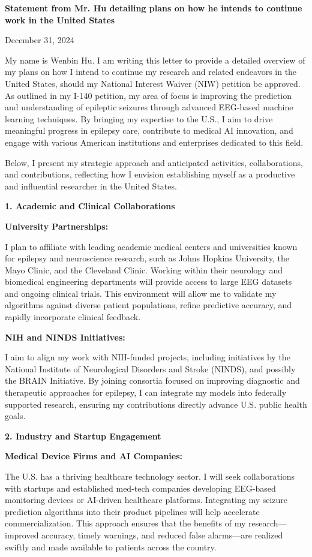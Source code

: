 \documentclass{article}
\begin{document}
\clearpage

{\bf Statement from Mr. Hu detailing plans on how he intends to continue work in the United States}

\label{plans}
December 31, 2024

My name is Wenbin Hu. I am writing this letter to provide a detailed overview of my plans on how I intend to continue my research and related endeavors in the United States, should my National Interest Waiver (NIW) petition be approved. As outlined in my I-140 petition, my area of focus is improving the prediction and understanding of epileptic seizures through advanced EEG-based machine learning techniques. By bringing my expertise to the U.S., I aim to drive meaningful progress in epilepsy care, contribute to medical AI innovation, and engage with various American institutions and enterprises dedicated to this field.

Below, I present my strategic approach and anticipated activities, collaborations, and contributions, reflecting how I envision establishing myself as a productive and influential researcher in the United States.


{\bf 1. Academic and Clinical Collaborations }

{\bf University Partnerships: }

I plan to affiliate with leading academic medical centers and universities known for epilepsy and neuroscience research, such as Johns Hopkins University, the Mayo Clinic, and the Cleveland Clinic. Working within their neurology and biomedical engineering departments will provide access to large EEG datasets and ongoing clinical trials. This environment will allow me to validate my algorithms against diverse patient populations, refine predictive accuracy, and rapidly incorporate clinical feedback.

{\bf NIH and NINDS Initiatives: }

I aim to align my work with NIH-funded projects, including initiatives by the National Institute of Neurological Disorders and Stroke (NINDS), and possibly the BRAIN Initiative. By joining consortia focused on improving diagnostic and therapeutic approaches for epilepsy, I can integrate my models into federally supported research, ensuring my contributions directly advance U.S. public health goals.

{\bf 2. Industry and Startup Engagement }

{\bf Medical Device Firms and AI Companies: }

The U.S. has a thriving healthcare technology sector. I will seek collaborations with startups and established med-tech companies developing EEG-based monitoring devices or AI-driven healthcare platforms. Integrating my seizure prediction algorithms into their product pipelines will help accelerate commercialization. This approach ensures that the benefits of my research—improved accuracy, timely warnings, and reduced false alarms—are realized swiftly and made available to patients across the country.
\end{document}
